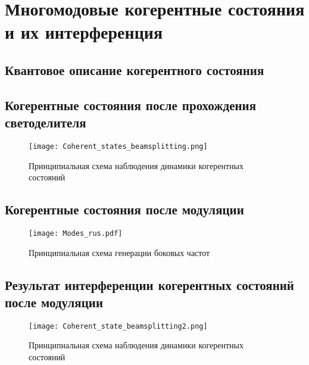 \chapter{Многомодовые когерентные состояния и их интерференция}  \label{ch:ch4}
\section{Квантовое описание когерентного состояния} \label{sec:ch4/sec1}


\pagebreak

\section{Когерентные состояния после прохождения светоделителя} \label{ch:ch4/sect2}

 \begin{figure}[ht]
  \centering
  \texttt{[image: Coherent\_states\_beamsplitting.png]}
  \caption{Принципиальная схема наблюдения динамики когерентных состояний}
  \label{fig:Coherent_states_beamsplitting}
\end{figure}

\pagebreak

\section{Когерентные состояния после модуляции} \label{ch:ch4/sect3}

 \begin{figure}[ht]
  \centering
  \texttt{[image: Modes\_rus.pdf]}
  \caption{Принципиальная схема генерации боковых частот}
  \label{fig:multimodes}
\end{figure}

\pagebreak

\section{Результат интерференции когерентных состояний после модуляции} \label{ch:ch4/sect4}

\begin{figure}[ht]
 \centering
  \texttt{[image: Coherent\_state\_beamsplitting2.png]}
  \caption{Принципиальная схема наблюдения динамики когерентных состояний}
  \label{fig:Coherent_states_beamsplitting2}
\end{figure}

